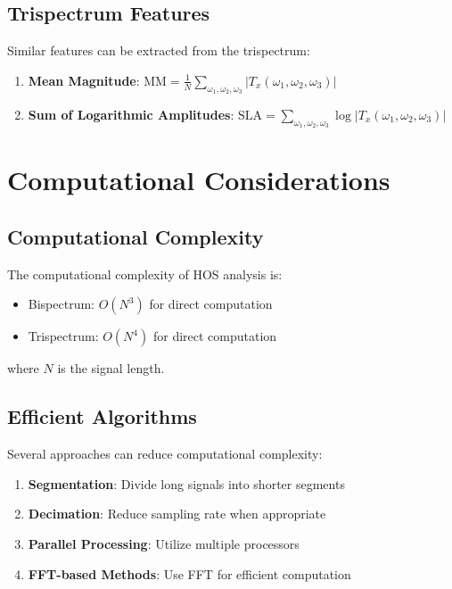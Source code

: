 \subsection{Trispectrum Features}

Similar features can be extracted from the trispectrum:

\begin{enumerate}
    \item \textbf{Mean Magnitude}: $\text{MM} = \frac{1}{N} \sum_{\omega_1, \omega_2, \omega_3} |T_x(\omega_1, \omega_2, \omega_3)|$
    \item \textbf{Sum of Logarithmic Amplitudes}: $\text{SLA} = \sum_{\omega_1, \omega_2, \omega_3} \log|T_x(\omega_1, \omega_2, \omega_3)|$
\end{enumerate}

\section{Computational Considerations}

\subsection{Computational Complexity}

The computational complexity of HOS analysis is:

\begin{itemize}
    \item Bispectrum: $O(N^3)$ for direct computation
    \item Trispectrum: $O(N^4)$ for direct computation
\end{itemize}

where $N$ is the signal length.

\subsection{Efficient Algorithms}

Several approaches can reduce computational complexity:

\begin{enumerate}
    \item \textbf{Segmentation}: Divide long signals into shorter segments
    \item \textbf{Decimation}: Reduce sampling rate when appropriate
    \item \textbf{Parallel Processing}: Utilize multiple processors
    \item \textbf{FFT-based Methods}: Use FFT for efficient computation
\end{enumerate}


